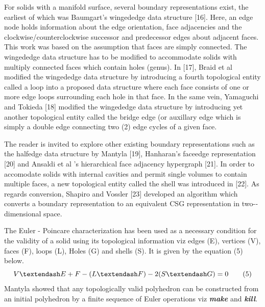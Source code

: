 \hspace{30} For   solids   with   a   manifold   surface,   several   boundary   representations  
exist,   the   earliest   of   which   was   Baumgart's   winged­edge   data   structure   [16].  
Here,   an   edge   node   holds   information   about   the   edge   orientation,   face  
adjacencies   and   the   clockwise/counterclockwise   successor   and   predecessor  
edges   about   adjacent   faces.   This   work   was   based   on   the   assumption   that  
faces   are   simply   connected.   The   winged­edge   data   structure   has   to   be  
modified   to   accommodate   solids   with   multiply   connected   faces   which   contain  
holes   (genus).   In   [17],   Braid   et   al   modified   the   winged­edge   data   structure   by  
introducing   a   fourth   topological   entity   called   a   loop   into   a   proposed   data  
structure   where   each   face   consists   of   one   or   more   edge   loops   surrounding  
each   hole   in   that   face.   In   the   same   vein,   Yamaguchi   and   Tokieda   [18]   modified  
the   winged­edge   data   structure   by   introducing   yet   another   topological   entity  
called   the   bridge   edge   (or   auxillary   edge   which   is   simply   a   double   edge 
connecting two (2) edge cycles of a given face.  

\hspace{30} The   reader   is   invited   to   explore   other   existing   boundary   representations  
such   as   the   half­edge   data   structure   by   Mantyla   [19],   Hanharan's   face­edge  
representation   [20]   and   Ansaldi   et   al   's   hierarchical   face   adjacency   hypergraph  
[21].   In   order   to   accomodate   solids   with   internal   cavities   and   permit   single  
volumes   to   contain   multiple   faces,   a   new   topological   entity   called   the   shell   was  
introduced   in   [22].   As   regards   conversion,   Shapiro   and   Vossler   [23]   developed  
an   algorithm   which   converts   a   boundary   representation   to   an   equivalent   CSG  
representation in two-­dimensional space.

\hspace{30} The   Euler - ­Poincare   characterization   has   been   used   as   a   necessary  
condition   for   the   validity   of   a   solid   using   its   topological   information   viz   edges  
(E),   vertices   (V),   faces   (F),   loops   (L),   Holes   (G)   and   shells   (S).   It   is   given   by   the  
equation (5) below.
\begin{equation*}
\centering
 V – E + F -­ ( L – F ) - 2(S – G ) = 0 ­­­­­­­­­­­­­­ \tag{5}
\end{equation*}
Mantyla   showed   that   any   topologically   valid   polyhedron   can   be   constructed  
from   an   initial   polyhedron   by   a   finite   sequence   of   Euler   operations   viz   \textit{\textbf{make}}  
and \textit{\textbf{kill}}.

